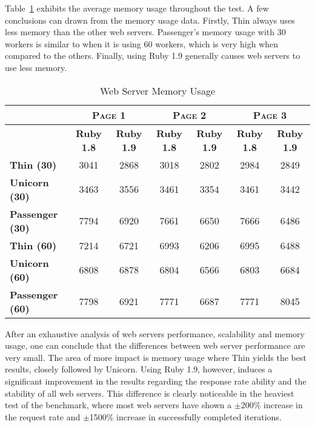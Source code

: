 Table~\ref{tab:web_server_memory_usage} exhibits the average memory usage throughout the test. A few conclusions can drawn from the memory usage data. Firstly, Thin always uses less memory than the other web servers. Passenger's memory usage with 30 workers is similar to when it is using 60 workers, which is very high when compared to the others. Finally, using Ruby 1.9 generally causes web servers to use less memory.
\begin{table}[h!t]
  \centering
  \caption{Web Server Memory Usage}
  \label{tab:web_server_memory_usage}
  
  \begin{tabular}{l|c|c|c|c|c|c}

     & \multicolumn{2}{c|}{\textbf{\textsc{Page 1}}} & \multicolumn{2}{c|}{\textbf{\textsc{Page 2}}} & \multicolumn{2}{c}{\textbf{\textsc{Page 3}}} \\ \hline
     & \textbf{Ruby 1.8} & \textbf{Ruby 1.9} & \textbf{Ruby 1.8} & \textbf{Ruby 1.9} & \textbf{Ruby 1.8} & \textbf{Ruby 1.9} \\ \hline
    \textbf{Thin (30)} & 3041 & 2868 & 3018 & 2802 & 2984 & 2849 \\ \hline
    \textbf{Unicorn (30)} & 3463 & 3556 & 3461 & 3354 & 3461 & 3442 \\ \hline
    \textbf{Passenger (30)} & 7794 & 6920 & 7661 & 6650 & 7666 & 6486 \\ \hline
    \textbf{Thin (60)} & 7214 & 6721 & 6993 & 6206 & 6995 & 6488 \\ \hline
    \textbf{Unicorn (60)} & 6808 & 6878 & 6804 & 6566 & 6803 & 6684 \\ \hline
    \textbf{Passenger (60)} & 7798 & 6921 & 7771 & 6687 & 7771 & 8045 \\
  \end{tabular}
\end{table}

After an exhaustive analysis of web servers performance, scalability and memory usage, one can conclude that the differences between web server performance are very small. The area of more impact is memory usage where Thin yields the best results, closely followed by Unicorn. Using Ruby 1.9, however, induces a significant improvement in the results regarding the response rate ability and the stability of all web servers. This difference is clearly noticeable in the heaviest test of the benchmark, where most web servers have shown a $\pm$200\% increase in the request rate and $\pm$1500\% increase in successfully completed iterations.

